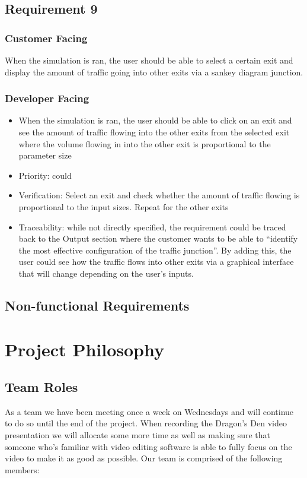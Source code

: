 \documentclass{article}
\begin{document}
\subsection{Requirement 9}
\subsubsection{Customer Facing}
When the simulation is ran, the user should be able to select a certain exit and display the amount of traffic going into other exits via a sankey diagram junction.
\subsubsection{Developer Facing}
\begin{itemize}
  \item When the simulation is ran, the user should be able to click on an exit and see the amount of traffic flowing into the other exits from the selected exit where the volume flowing in into the other exit is proportional to the parameter size
  \item Priority: could
  \item Verification: Select an exit and check whether the amount of traffic flowing is proportional to the input sizes. Repeat for the other exits
  \item Traceability: while not directly specified, the requirement could be traced back to the Output section where the customer wants to be able to “identify the most effective configuration of the traffic junction”. By adding this, the user could see how the traffic flows into other exits via a graphical interface that will change depending on the user's inputs.
\end{itemize}

\subsection{Non-functional Requirements}

\section{Project Philosophy}
\subsection{Team Roles}

As a team we have been meeting once a week on Wednesdays and will continue to do 
so until the end of the project. When recording the Dragon's Den video presentation 
we will allocate some more time as well as making sure that someone who's familiar 
with video editing software is able to fully focus on the video to make it as good
as possible. Our team is comprised of the following members:
\end{document}
